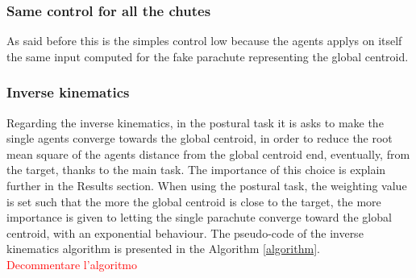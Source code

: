 \subsubsection{Same control for all the chutes}
As said before this is the simples control low because the agents applys on itself the same input computed for the fake parachute representing the global centroid.
\subsubsection{Inverse kinematics}
 Regarding the inverse kinematics, in the postural task it is asks to make the single agents converge towards the global centroid, in order to reduce the root mean square of the agents distance from the global centroid end, eventually, from the target, thanks to the main task. The importance of this choice is explain further in the Results section.  When using the postural task, the weighting value is set such that the more the global centroid is close to the target, the more importance is given to letting the single parachute converge toward the global centroid, with an exponential behaviour. The pseudo-code of the inverse kinematics algorithm is presented in the Algorithm \ref{algorithm}.\\
\textcolor{red}{Decommentare l'algoritmo}

